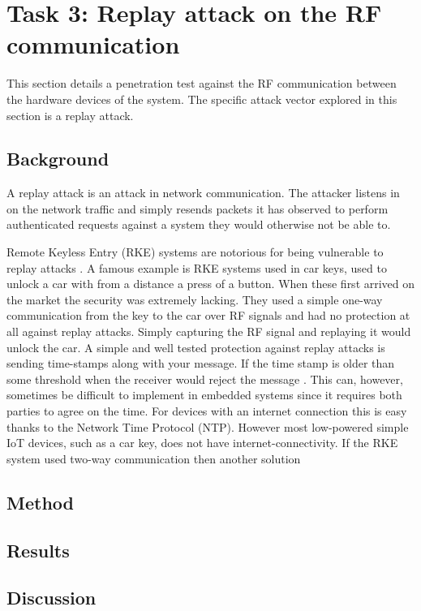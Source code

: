 \section{Task 3: Replay attack on the RF communication} \label{ch:pentesting:replay}
This section details a penetration test against the RF communication between the hardware devices of the system. The specific attack vector explored in this section is a replay attack.

\subsection{Background}
A replay attack is an attack in network communication. The attacker listens in on the network traffic and simply resends packets it has observed to perform authenticated requests against a system they would otherwise not be able to.

Remote Keyless Entry (RKE) systems are notorious for being vulnerable to replay attacks \cite{rke-replay}. A famous example is RKE systems used in car keys, used to unlock a car with from a distance a press of a button. When these first arrived on the market the security was extremely lacking. They used a simple one-way communication from the key to the car over RF signals and had no protection at all against replay attacks. Simply capturing the RF signal and replaying it would unlock the car. A simple and well tested protection against replay attacks is sending time-stamps along with your message. If the time stamp is older than some threshold when the receiver would reject the message \cite{rke-replay}. This can, however, sometimes be difficult to implement in embedded systems since it requires both parties to agree on the time. For devices with an internet connection this is easy thanks to the Network Time Protocol (NTP). However most low-powered simple IoT devices, such as a car key, does not have internet-connectivity. If the RKE system used two-way communication then another solution 

\subsection{Method}

\subsection{Results}

\subsection{Discussion}

